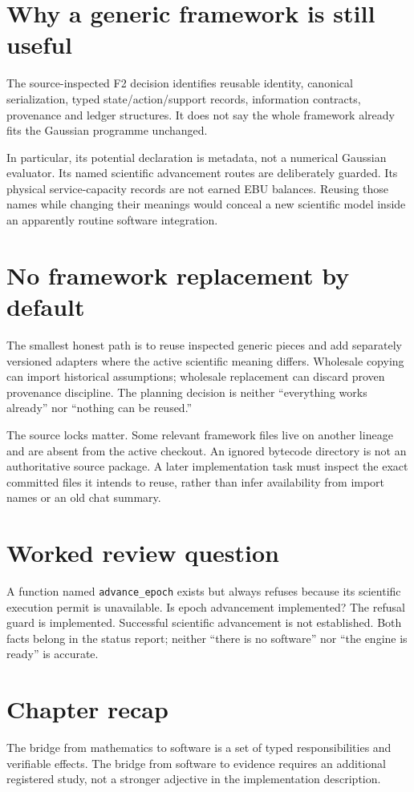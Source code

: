 \section{Why a generic framework is still useful}
The source-inspected F2 decision \cite{framework} identifies reusable
identity, canonical serialization, typed state/action/support records,
information contracts, provenance and ledger structures. It does not say
the whole framework already fits the Gaussian programme unchanged.

In particular, its potential declaration is metadata, not a numerical
Gaussian evaluator. Its named scientific advancement routes are deliberately
guarded. Its physical service-capacity records are not earned EBU balances.
Reusing those names while changing their meanings would conceal a new
scientific model inside an apparently routine software integration.

\section{No framework replacement by default}
The smallest honest path is to reuse inspected generic pieces and add
separately versioned adapters where the active scientific meaning differs.
Wholesale copying can import historical assumptions; wholesale replacement
can discard proven provenance discipline. The planning decision is neither
``everything works already'' nor ``nothing can be reused.''

The source locks matter. Some relevant framework files live on another
lineage and are absent from the active checkout. An ignored bytecode
directory is not an authoritative source package. A later implementation
task must inspect the exact committed files it intends to reuse, rather
than infer availability from import names or an old chat summary.

\section*{Worked review question}
A function named \texttt{advance\_epoch} exists but always refuses because
its scientific execution permit is unavailable. Is epoch advancement
implemented? The refusal guard is implemented. Successful scientific
advancement is not established. Both facts belong in the status report;
neither ``there is no software'' nor ``the engine is ready'' is accurate.

\section*{Chapter recap}
The bridge from mathematics to software is a set of typed responsibilities
and verifiable effects. The bridge from software to evidence requires an
additional registered study, not a stronger adjective in the implementation
description.
